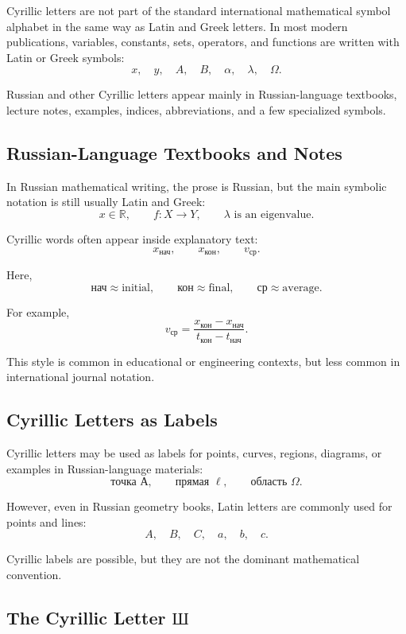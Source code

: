 \documentclass[11pt,twocolumn]{article}
\newcommand{\R}{\mathbb{R}}
\begin{document}
Cyrillic letters are not part of the standard international mathematical
symbol alphabet in the same way as Latin and Greek letters. In most modern
publications, variables, constants, sets, operators, and functions are written
with Latin or Greek symbols:
\[
x,\quad y,\quad A,\quad B,\quad \alpha,\quad \lambda,\quad \Omega.
\]

Russian and other Cyrillic letters appear mainly in Russian-language textbooks,
lecture notes, examples, indices, abbreviations, and a few specialized symbols.

\subsection{Russian-Language Textbooks and Notes}

In Russian mathematical writing, the prose is Russian, but the main symbolic
notation is still usually Latin and Greek:
\[
x \in \R,
\qquad
f:X\to Y,
\qquad
\lambda \text{ is an eigenvalue}.
\]

Cyrillic words often appear inside explanatory text:
\[
x_{\text{нач}},
\qquad
x_{\text{кон}},
\qquad
v_{\text{ср}}.
\]

Here,
\[
\text{нач} \approx \text{initial},
\qquad
\text{кон} \approx \text{final},
\qquad
\text{ср} \approx \text{average}.
\]

For example,
\[
v_{\text{ср}}
=
\frac{x_{\text{кон}}-x_{\text{нач}}}{t_{\text{кон}}-t_{\text{нач}}}.
\]

This style is common in educational or engineering contexts, but less common
in international journal notation.

\subsection{Cyrillic Letters as Labels}

Cyrillic letters may be used as labels for points, curves, regions, diagrams,
or examples in Russian-language materials:
\[
\text{точка А},
\qquad
\text{прямая } \ell,
\qquad
\text{область } \Omega.
\]

However, even in Russian geometry books, Latin letters are commonly used for
points and lines:
\[
A,\quad B,\quad C,\quad a,\quad b,\quad c.
\]

Cyrillic labels are possible, but they are not the dominant mathematical
convention.

\subsection{The Cyrillic Letter \texorpdfstring{$\text{Ш}$}{Sh}}
\end{document}
